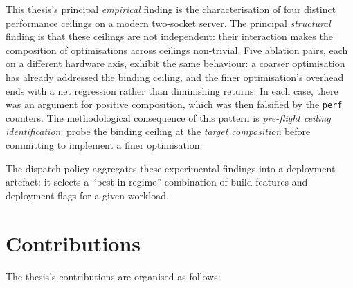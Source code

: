 This thesis's principal \emph{empirical} finding is the characterisation of four distinct performance ceilings on a modern two-socket server. The principal \emph{structural} finding is that these ceilings are not independent: their interaction makes the composition of optimisations across ceilings non-trivial. Five ablation pairs, each on a different hardware axis, exhibit the same behaviour: a coarser optimisation has already addressed the binding ceiling, and the finer optimisation's overhead ends with a net regression rather than diminishing returns. In each case, there was an argument for positive composition, which was then falsified by the \texttt{perf} counters. The methodological consequence of this pattern is \emph{pre-flight ceiling identification}: probe the binding ceiling at the \emph{target composition} before committing to implement a finer optimisation.

The dispatch policy aggregates these experimental findings into a deployment artefact: it selects a ``best in regime'' combination of build features and deployment flags for a given workload.


\section{Contributions\label{sec:contributions}}

The thesis's contributions are organised as follows:

